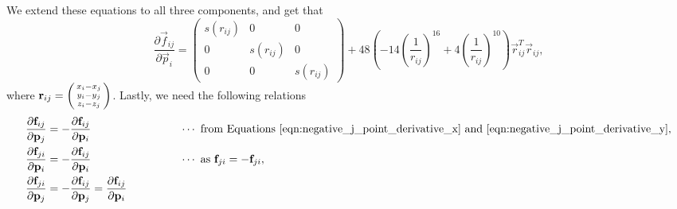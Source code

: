 \documentclass[../Main.tex]{subfiles}
\begin{document}
We extend these equations to all three components, and get that
$$
\renewcommand\arraystretch{1.5}
\frac{\partial \vec{f}_{ij}}{\partial \vec{p}_{i}} = 
	\begin{pmatrix}
		s(r_{ij}) & 0 & 0 \\
		0 & s(r_{ij}) & 0 \\
		0 & 0 & s(r_{ij})
	\end{pmatrix} + 48\left(-14\left(\frac{1}{r_{ij}}\right)^{16}+ 4\left(\frac{1}{r_{ij}}\right)^{10}\right)\vec{r}_{ij}^{T}\vec{r}_{ij},
$$ where $\vec{r}_{ij} = \begin{psmallmatrix} x_{i} - x_{j} \\ y_{i} - y{_j} \\ z_{i} - z_{j}\end{psmallmatrix}$.
Lastly, we need the following relations
\begin{align}
\frac{\partial \vec{f}_{ij}}{\partial \vec{p}_{j}} &= -\frac{\partial \vec{f}_{ij}}{\partial \vec{p}_{i}} \qquad \qquad \qquad \qquad\cdots \mbox{  from Equations \ref{eqn:negative_j_point_derivative_x} and \ref{eqn:negative_j_point_derivative_y}}, \\
\frac{\partial \vec{f}_{ji}}{\partial \vec{p}_{i}} &= -\frac{\partial \vec{f}_{ij}}{\partial \vec{p}_{i}} \qquad \qquad \qquad \qquad\cdots \mbox{  as } \vec{f}_{ji} = -\vec{f}_{ji}, \\
\frac{\partial \vec{f}_{ji}}{\partial \vec{p}_{j}} &= -\frac{\partial \vec{f}_{ij}}{\partial \vec{p}_{j}} = \frac{\partial \vec{f}_{ij}}{\partial \vec{p}_{i}}
\end{align}
\end{document}
